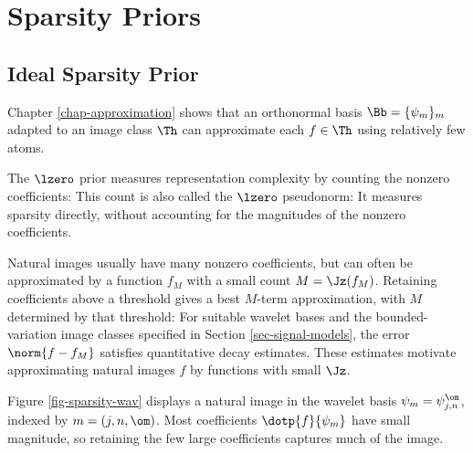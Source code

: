 \section{Sparsity Priors}

                                                                      
\subsection{Ideal Sparsity Prior}

Chapter \ref{chap-approximation} shows that an orthonormal basis $\Bb = \{ \psi_m \}_m$ adapted to an image class $\Th$ can approximate each $f\in\Th$ using relatively few atoms.

The $\lzero$ prior measures representation complexity by counting the nonzero coefficients:
This count is also called the $\lzero$ pseudonorm:
It measures sparsity directly, without accounting for the magnitudes of the nonzero coefficients.

Natural images usually have many nonzero coefficients, but can often be approximated by a function $f_M$ with a small count $M=\Jz(f_M)$. Retaining coefficients above a threshold gives a best $M$-term approximation, with $M$ determined by that threshold:
For suitable wavelet bases and the bounded-variation image classes specified in Section \ref{sec-signal-models}, the error $\norm{f-f_M}$ satisfies quantitative decay estimates. These estimates motivate approximating natural images $f$ by functions with small $\Jz$.

Figure \ref{fig-sparsity-wav} displays a natural image in the wavelet basis $\psi_m = \psi_{j,n}^\om$, indexed by $m=(j,n,\om)$. Most coefficients $\dotp{f}{\psi_m}$ have small magnitude, so retaining the few large coefficients captures much of the image.



